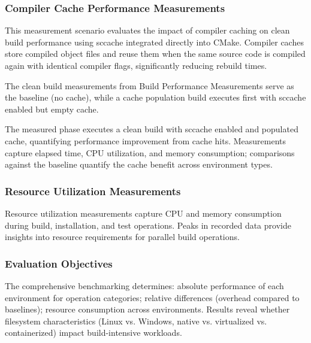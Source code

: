 \subsubsection{Compiler Cache Performance Measurements}

This measurement scenario evaluates the impact of compiler caching on clean build performance using sccache integrated directly into CMake.
Compiler caches store compiled object files and reuse them when the same source code is compiled again with identical compiler flags, significantly reducing rebuild times.

The clean build measurements from Build Performance Measurements serve as the baseline (no cache), while a cache population build executes first with sccache enabled but empty cache.

The measured phase executes a clean build with sccache enabled and populated cache, quantifying performance improvement from cache hits.
Measurements capture elapsed time, CPU utilization, and memory consumption; comparisons against the baseline quantify the cache benefit across environment types.

\subsubsection{Resource Utilization Measurements}

Resource utilization measurements capture CPU and memory consumption during build, installation, and test operations.
Peaks in recorded data provide insights into resource requirements for parallel build operations.

\subsubsection{Evaluation Objectives}

The comprehensive benchmarking determines: absolute performance of each environment for operation categories; relative differences (overhead compared to baselines); resource consumption across environments.
Results reveal whether filesystem characteristics (Linux vs. Windows, native vs. virtualized vs. containerized) impact \mbox{build-intensive} workloads.
